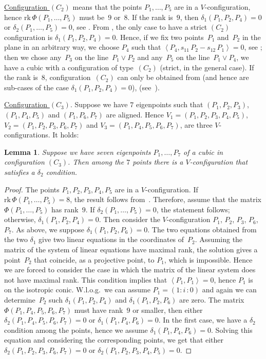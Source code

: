 \documentclass[a4paper, 11pt, reqno]{amsart}
\theoremstyle{plain}
\newtheorem{lemma}{Lemma}[section]
\theoremstyle{definition}
\newcommand{\iii}{\textit{i}\,}
\newcommand{\rk}{\ensuremath{\mathrm{rk}}}
\newcommand{\scl}[2]{\left\langle {#1}, {#2} \right\rangle}
\begin{document}
\underline{Configuration $(C_2)$} means that the points
$P_1, \dots, P_5$ are in a
$V$-configuration, hence $\rk \, \Phi(P_1, \dotsc, P_5)$
must be~$9$ or~$8$. If the rank is~$9$, then $\delta_1(P_1, P_2, P_4) = 0$
or $\delta_2(P_1, \dotsc, P_5) = 0$, see .
From , the only case
to have a strict $(C_2)$ configuration 
is $\delta_1(P_1, P_2, P_4) = 0$. Hence, if we fix two points~$P_1$ and~$P_2$
in the plane in an arbitrary way, we choose $P_4$ such that
$\scl{P_4}{s_{11}\, P_2 - s_{12} \, P_1}=0$, see ; then we chose any~$P_3$
on the line~$P_1 \vee P_2$ and any~$P_5$ on the line~$P_1 \vee P_4$, we have a cubic with a configuration of type~$(C_2)$ (strict, in the general case). If the rank is~$8$, configuration~$(C_2)$ can only be obtained from  (and hence are sub-cases of the case $\delta_1(P_1, P_2, P_4)=0$), (see~).

\underline{Configuration $(C_3)$}. Suppose we have $7$ eigenpoints such that
$(P_1, P_2, P_3)$, $(P_1, P_4, P_5)$ and $(P_1, P_6, P_7)$ are
aligned. Hence
$V_1 = (P_1, P_2, P_3, P_4, P_5)$, $V_2 = (P_1, P_2, P_3, P_6, P_7)$ and
$V_3 = (P_1, P_4, P_5, P_6, P_7)$, are three $V$-configurations. It holds:

\begin{lemma}
\label{no_delta1_delta1} Suppose we have seven eigenpoints $P_1, \dots, P_7$
of a cubic in configuration $(C_3)$. Then among the $7$ points there is a
$V$-configuration that satisfies a $\delta_2$ condition.
\end{lemma}
\begin{proof}
The points $P_1, P_2, P_3, P_4, P_5$ are in a $V$-configuration.
If $\rk \, \Phi(P_1, \dots, P_5) = 8$, the result follows from~.
Therefore, assume that the matrix $\Phi(P_1, \dots, P_5)$ has rank~$9$.
If $\delta_2(P_1, \dots, P_5) = 0$, the statement follows;
otherwise, $\delta_1(P_1, P_2, P_4) = 0$.
Then consider the $V$-configuration $P_1$, $P_2$, $P_3$, $P_6$, $P_7$.
As above, we suppose $\delta_1(P_1, P_2, P_6) = 0$.
The two equations obtained from the two $\delta_1$ give two
linear equations in the coordinates of~$P_2$.
Assuming the matrix of the system of linear equations have
maximal rank, the solution gives a point~$P_2$ that coincide, as
a projective point, to $P_1$, which is impossible.
Hence we are forced to consider the
case in which the matrix of the linear system does not have maximal rank.
This condition implies that $\scl{P_1}{P_1} = 0$, hence $P_1$ is on the
isotropic conic. W.l.o.g.\ we can assume $P_1 = (1: \iii: 0)$ and again
we can determine~$P_2$ such $\delta_1(P_1, P_2, P_4)$ and
$\delta_1(P_1, P_2, P_6)$ are zero. The matrix $\Phi(P_1, P_4, P_5, P_6, P_7)$
must have rank~$9$ or smaller, then either
$\delta_2(P_1, P_4, P_5, P_6, P_7)=0$ or $\delta_1(P_1, P_4, P_6) = 0$. In
the first case, we have a $\delta_2$ condition among the points, hence
we assume $\delta_1(P_1, P_4, P_6) = 0$. Solving this equation and
considering the corresponding points, we get that either
$\delta_2(P_1, P_2, P_3, P_6, P_7) = 0$ or
$\delta_2(P_1, P_2, P_3, P_4, P_5) = 0$.
\end{proof}
\end{document}
